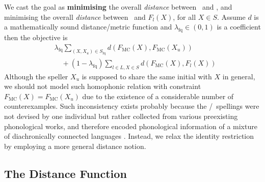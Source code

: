 
We cast the goal as \textbf{minimising} the overall \textit{distance} between \fmc~and \fmcu,
and minimising the overall \textit{distance} between \fmc~and $F_l(X)$, for all $X\in S$.
Assume $d$ is a mathematically sound distance/metric function and $\lambda_{\text{fq}}\in(0,1)$ is a coefficient then the objective is
\begin{equation}\label{eq:objective}
  \begin{aligned}
    & \lambda_{\text{fq}} \sum_{(X,X_u) \in S_{\text{fq}}} 
       d(F_{\text{MC}}(X), F_{\text{MC}}(X_u))\\
    & \quad+ (1-\lambda_{\text{fq}}) \sum_{l\in L, X \in S} d(F_{\text{MC}}(X), F_l(X))
  \end{aligned}
\end{equation}
Although the speller $X_{u}$ is supposed to share the same initial with $X$ in general, 
we should not model such homophonic relation with constraint $F_{\text{MC}}(X)=F_{\text{MC}}(X_u)$ due to the existence of a considerable number of counterexamples.
Such inconsistency exists probably because the \fq/\zhiyin~spellings were not devised by one individual but rather collected from various preexisting phonological works, and therefore encoded phonological information of a mixture of diachronically connected languages \citep{shen_2020}.
Instead, we relax the identity restriction by employing a more general distance notion.


\subsection{The Distance Function} \label{sec:dis-f}

